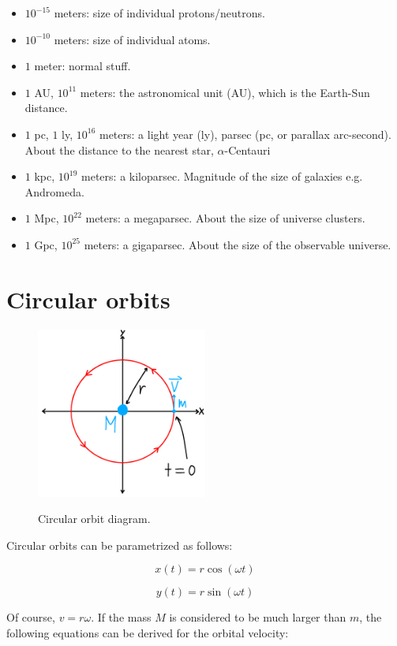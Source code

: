 \documentclass[12pt]{article}
\begin{document}
\begin{itemize}
	\item $10^{-15}$ meters: size of individual protons/neutrons.
	\item $10^{-10}$ meters: size of individual atoms.
	\item $1$ meter: normal stuff.
	\item $1$ AU, $10^{11}$ meters: the astronomical unit (AU), which is the Earth-Sun distance.
	\item $1$ pc, $1$ ly, $10^{16}$ meters: a light year (ly), parsec (pc, or parallax arc-second). About the distance to the nearest star, $\alpha$-Centauri
	\item $1$ kpc, $10^{19}$ meters: a kiloparsec. Magnitude of the size of galaxies e.g. Andromeda.
	\item $1$ Mpc, $10^{22}$ meters: a megaparsec. About the size of universe clusters.
	\item $1$ Gpc, $10^{25}$ meters: a gigaparsec. About the size of the observable universe. 
\end{itemize}

\section{Circular orbits}

\begin{figure}
    \centering
    \includegraphics[width=0.5\textwidth]{circular_orbit}
    \label{fig:circularorbit}
    \caption{Circular orbit diagram.}
\end{figure}

Circular orbits can be parametrized as follows:

\[
x(t) = r\cos(\omega t)
\]

\[
y(t) = r\sin(\omega t)
\]

Of course, $v = r\omega$.
If the mass $M$ is considered to be much larger than $m$, the following equations can be derived for the orbital velocity:
\end{document}
